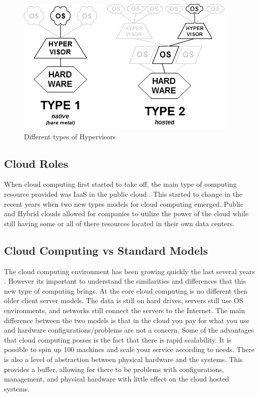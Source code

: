 \documentclass[12pt]{article}
\begin{document}
\begin{figure}[H]
    \centering
    \includegraphics[scale=.8]{./pic/Hyperviseur.png}
    \caption{Different types of Hypervisors}
    \label{fig:Hypervisors}
\end{figure}

\subsection{Cloud Roles}
When cloud computing first started to take off, the main type of computing resource provided was IaaS in the public cloud \cite{sourcedigit}. This started to change in the recent years when two new types models for cloud computing emerged. Public and Hybrid clouds allowed for companies to utilize the power of the cloud while still having some or all of there resources located in their own data centers.

\subsection{Cloud Computing vs Standard Models}
The cloud computing environment has been growing quickly the last several years \cite{Vaquero}. However its important to understand the similarities and differences that this new type of computing brings. At the core cloud computing is no different then older client server models. The data is still on hard drives, servers still use OS environments, and networks still connect the servers to the Internet. The main difference between the two models is that in the cloud you pay for what you use and hardware configurations/problems are not a concern. Some of the advantages that cloud computing posses is the fact that there is rapid scalability. It is possible to spin up 100 machines and scale your service according to needs. There is also a level of abstraction between physical hardware and the systems. This provides a buffer, allowing for there to be problems with configurations, management, and physical hardware with little effect on the cloud hosted systems.
\end{document}

